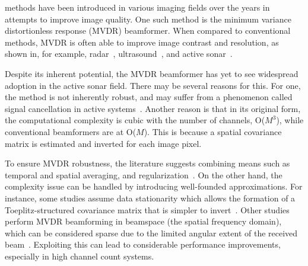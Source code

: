  methods have been introduced in various imaging fields over the years in attempts to improve image quality. One such method is the minimum variance distortionless response (MVDR) beamformer. When compared to conventional methods, MVDR is often able to improve image contrast and resolution, as shown in, for example, radar~\cite{Benitz1997}, ultrasound~\cite{Synnevag2007}, and active sonar~\cite{Blomberg2013,Blomberg2012a,Dursun2009,Lo2004}.

Despite its inherent potential, the MVDR beamformer has yet to see widespread adoption in the active sonar field. There may be several reasons for this. For one, the method is not inherently robust, and may suffer from a phenomenon called signal cancellation in active systems~\cite{Widrow1982}. Another reason is that in its original form, the computational complexity is cubic with the number of channels, O($M^3$), while conventional beamformers are at O($M$). This is because a spatial covariance matrix is estimated and inverted for each image pixel.

To ensure MVDR robustness, the literature suggests combining means such as temporal and spatial averaging, and regularization~\cite{VanTrees2002,Kailath1985}. On the other hand, the complexity issue can be handled by introducing well-founded approximations. For instance, some studies assume data stationarity which allows the formation of a Toeplitz-structured covariance matrix that is simpler to invert~\cite{Asl2012a,Jakobsson2000}. Other studies perform MVDR beamforming in beamspace (the spatial frequency domain), which can be considered sparse due to the limited angular extent of the received beam~\cite{VanTrees2002,Nilsen2009}. Exploiting this can lead to considerable performance improvements, especially in high channel count systems.




